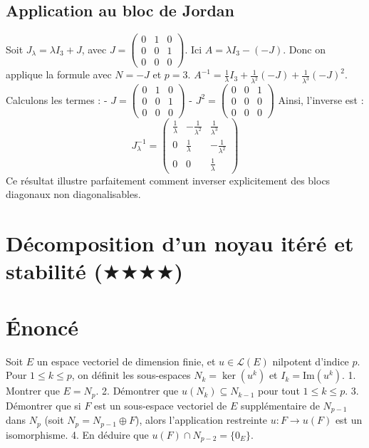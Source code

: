 \documentclass[11pt,a4paper]{article}
\begin{document}
\subsection{Application au bloc de Jordan}
Soit $J_{\lambda} = \lambda I_3 + J$, avec $J = \begin{pmatrix} 0 & 1 & 0 \\ 0 & 0 & 1 \\ 0 & 0 & 0 \end{pmatrix}$.
Ici $A = \lambda I_3 - (-J)$. Donc on applique la formule avec $N = -J$ et $p=3$.
$A^{-1} = \frac{1}{\lambda} I_3 + \frac{1}{\lambda^2} (-J) + \frac{1}{\lambda^3} (-J)^2$.
Calculons les termes :
- $J = \begin{pmatrix} 0 & 1 & 0 \\ 0 & 0 & 1 \\ 0 & 0 & 0 \end{pmatrix}$
- $J^2 = \begin{pmatrix} 0 & 0 & 1 \\ 0 & 0 & 0 \\ 0 & 0 & 0 \end{pmatrix}$
Ainsi, l'inverse est :
$$J_{\lambda}^{-1} = \begin{pmatrix} \frac{1}{\lambda} & -\frac{1}{\lambda^2} & \frac{1}{\lambda^3} \\ 0 & \frac{1}{\lambda} & -\frac{1}{\lambda^2} \\ 0 & 0 & \frac{1}{\lambda} \end{pmatrix}$$
Ce résultat illustre parfaitement comment inverser explicitement des blocs diagonaux non diagonalisables.


\section{Décomposition d'un noyau itéré et stabilité ($\bigstar$$\bigstar$$\bigstar$$\bigstar$)}

\section{Énoncé}
Soit $E$ un espace vectoriel de dimension finie, et $u \in \mathcal{L}(E)$ nilpotent d'indice $p$.
Pour $1 \le k \le p$, on définit les sous-espaces $N_k = \ker(u^k)$ et $I_k = \text{Im}(u^k)$.
1. Montrer que $E = N_p$.
2. Démontrer que $u(N_{k}) \subseteq N_{k-1}$ pour tout $1 \le k \le p$.
3. Démontrer que si $F$ est un sous-espace vectoriel de $E$ supplémentaire de $N_{p-1}$ dans $N_p$ (soit $N_p = N_{p-1} \oplus F$), alors l'application restreinte $u : F \to u(F)$ est un isomorphisme.
4. En déduire que $u(F) \cap N_{p-2} = \{0_E\}$.
\end{document}
